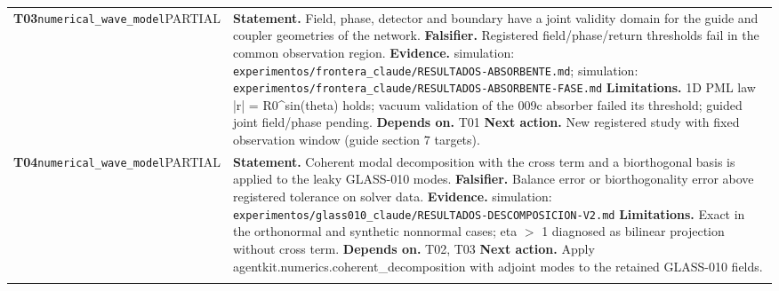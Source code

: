 \begin{longtable}{@{}>{\raggedright\arraybackslash}p{2.35cm}>{\raggedright\arraybackslash}p{13.2cm}@{}}
\textbf{T03}\newline \texttt{numerical\_\allowbreak{}wave\_\allowbreak{}model}\newline PARTIAL & \textbf{Statement.} Field, phase, detector and boundary have a joint validity domain for the guide and coupler geometries of the network. \newline \textbf{Falsifier.} Registered field/\allowbreak{}phase/\allowbreak{}return thresholds fail in the common observation region. \newline \textbf{Evidence.} simulation: \texttt{experimentos/\allowbreak{}frontera\_\allowbreak{}claude/\allowbreak{}RESULTADOS-ABSORBENTE.md}; simulation: \texttt{experimentos/\allowbreak{}frontera\_\allowbreak{}claude/\allowbreak{}RESULTADOS-ABSORBENTE-FASE.md} \newline \textbf{Limitations.} 1D PML law |r| = R0\textasciicircum{}sin(theta) holds; vacuum validation of the 009c absorber failed its threshold; guided joint field/\allowbreak{}phase pending. \newline \textbf{Depends on.} T01 \newline \textbf{Next action.} New registered study with fixed observation window (guide section 7 targets). \\ \addlinespace[2pt]
\textbf{T04}\newline \texttt{numerical\_\allowbreak{}wave\_\allowbreak{}model}\newline PARTIAL & \textbf{Statement.} Coherent modal decomposition with the cross term and a biorthogonal basis is applied to the leaky GLASS-010 modes. \newline \textbf{Falsifier.} Balance error or biorthogonality error above registered tolerance on solver data. \newline \textbf{Evidence.} simulation: \texttt{experimentos/\allowbreak{}glass010\_\allowbreak{}claude/\allowbreak{}RESULTADOS-DESCOMPOSICION-V2.md} \newline \textbf{Limitations.} Exact in the orthonormal and synthetic nonnormal cases; eta $>$ 1 diagnosed as bilinear projection without cross term. \newline \textbf{Depends on.} T02, T03 \newline \textbf{Next action.} Apply agentkit.numerics.coherent\_\allowbreak{}decomposition with adjoint modes to the retained GLASS-010 fields. \\ \addlinespace[2pt]

\end{longtable}
